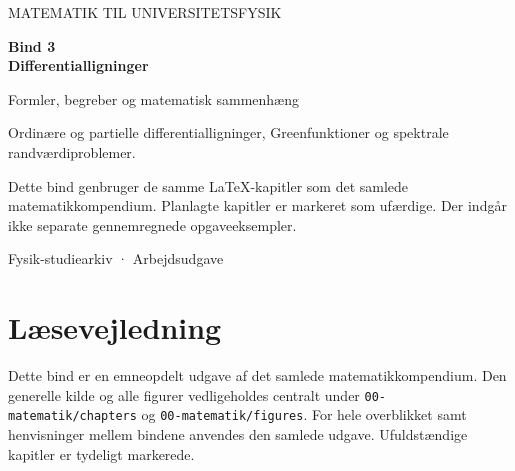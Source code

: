 \documentclass[11pt,a4paper,oneside]{book}
\begin{document}
\frontmatter
\begin{titlepage}
\centering
\vspace*{30mm}
{\sffamily\color{arkivblaa}\Large MATEMATIK TIL UNIVERSITETSFYSIK\par}
\vspace{16mm}
{\Huge\bfseries Bind 3\\[6mm]Differentialligninger\par}
\vspace{13mm}
{\Large Formler, begreber og matematisk sammenhæng\par}
\vfill
\begin{minipage}{0.8\textwidth}
Ordinære og partielle differentialligninger, Greenfunktioner og spektrale randværdiproblemer.

Dette bind genbruger de samme LaTeX-kapitler som det samlede matematikkompendium. Planlagte kapitler er markeret som ufærdige. Der indgår ikke separate gennemregnede opgaveeksempler.
\end{minipage}
\vspace{14mm}
{\small Fysik-studiearkiv · Arbejdsudgave\par}
\end{titlepage}
\chapter*{Læsevejledning}
Dette bind er en emneopdelt udgave af det samlede matematikkompendium. Den generelle kilde og alle figurer vedligeholdes centralt under \texttt{00-matematik/chapters} og \texttt{00-matematik/figures}. For hele overblikket samt henvisninger mellem bindene anvendes den samlede udgave. Ufuldstændige kapitler er tydeligt markerede.
\begingroup\small\tableofcontents\endgroup
\mainmatter




\end{document}
